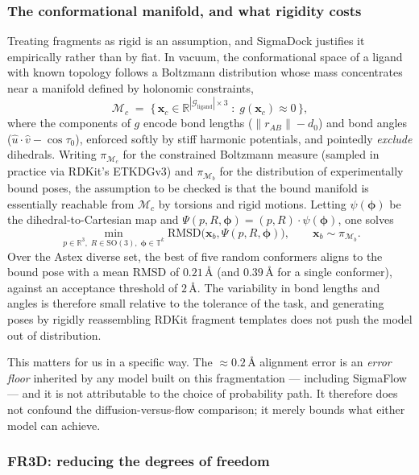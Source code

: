 \documentclass[a4paper,12pt]{article}
\theoremstyle{remark}
\begin{document}
\subsubsection{The conformational manifold, and what rigidity costs}
\label{sec:conformational-manifold}

Treating fragments as rigid is an assumption, and SigmaDock justifies it empirically rather than
by fiat. In vacuum, the conformational space of a ligand with known topology follows a Boltzmann
distribution whose mass concentrates near a manifold defined by holonomic constraints,
\[
  \mathcal{M}_c \;=\; \{\, \mathbf{x}_c \in \mathbb{R}^{|\mathcal{G}_{\text{ligand}}|\times 3} \;:\;
  g(\mathbf{x}_c) \approx 0 \,\},
\]
where the components of $g$ encode bond lengths ($\|r_{AB}\| - d_0$) and bond angles
($\hat{u}\cdot\hat{v} - \cos\tau_0$), enforced softly by stiff harmonic potentials, and pointedly
\emph{exclude} dihedrals. Writing $\pi_{\mathcal{M}_c}$ for the constrained Boltzmann measure
(sampled in practice via RDKit's ETKDGv3) and $\pi_{\mathcal{M}_b}$ for the distribution of
experimentally bound poses, the assumption to be checked is that the bound manifold is essentially
reachable from $\mathcal{M}_c$ by torsions and rigid motions. Letting
$\psi(\bm{\phi})$ be the dihedral-to-Cartesian map and
$\Psi(p,R,\bm{\phi}) = (p,R)\cdot\psi(\bm{\phi})$, one solves
\[
  \min_{p \in \mathbb{R}^3,\; R \in \mathrm{SO}(3),\; \bm{\phi} \in \mathbb{T}^k}
  \mathrm{RMSD}\big(\mathbf{x}_b, \Psi(p,R,\bm{\phi})\big), \qquad \mathbf{x}_b \sim \pi_{\mathcal{M}_b}.
\]
Over the Astex diverse set, the best of five random conformers aligns to the bound pose with a mean
RMSD of $0.21\,\text{\AA}$ (and $0.39\,\text{\AA}$ for a single conformer), against an acceptance
threshold of $2\,\text{\AA}$. The variability in bond lengths and angles is therefore small relative
to the tolerance of the task, and generating poses by rigidly reassembling RDKit fragment templates
does not push the model out of distribution.

This matters for us in a specific way. The $\approx 0.2\,\text{\AA}$ alignment error is an
\emph{error floor} inherited by any model built on this fragmentation --- including SigmaFlow ---
and it is not attributable to the choice of probability path. It therefore does not confound the
diffusion-versus-flow comparison; it merely bounds what either model can achieve.

\subsubsection{FR3D: reducing the degrees of freedom}
\end{document}
